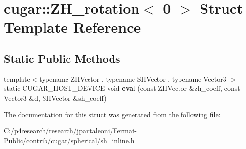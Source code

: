 \hypertarget{structcugar_1_1_z_h__rotation_3_010_01_4}{}\section{cugar\+:\+:Z\+H\+\_\+rotation$<$ 0 $>$ Struct Template Reference}
\label{structcugar_1_1_z_h__rotation_3_010_01_4}
\subsection*{Static Public Methods}
\begin{DoxyCompactItemize}
\item 
\mbox{\label{structcugar_1_1_z_h__rotation_3_010_01_4_ab94a95b2db579f9c25d609edf04d3751}} 
{\footnotesize template$<$typename Z\+H\+Vector , typename S\+H\+Vector , typename Vector3 $>$ }\\static C\+U\+G\+A\+R\+\_\+\+H\+O\+S\+T\+\_\+\+D\+E\+V\+I\+CE void {\bfseries eval} (const Z\+H\+Vector \&zh\+\_\+coeff, const Vector3 \&d, S\+H\+Vector \&sh\+\_\+coeff)
\end{DoxyCompactItemize}


The documentation for this struct was generated from the following file\+:\begin{DoxyCompactItemize}
\item 
C\+:/p4research/research/jpantaleoni/\+Fermat-\/\+Public/contrib/cugar/spherical/sh\+\_\+inline.\+h\end{DoxyCompactItemize}
